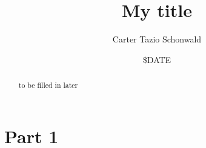 \documentclass[letterpaper,11pt,reqno]{amsart}
\begin{document}
\title{My title}
\author{Carter Tazio Schonwald}
\date{\${DATE}}
\begin{abstract}

 to be filled in later

\end{abstract}
\maketitle
\section{Part 1}
\end{document}
